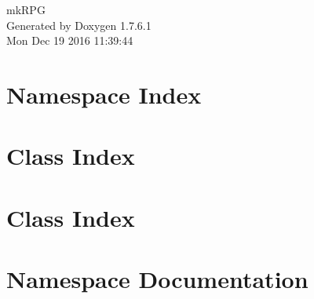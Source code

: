 \documentclass[a4paper]{book}
\begin{document}
\hypersetup{pageanchor=false,citecolor=blue}
\begin{titlepage}
\vspace*{7cm}
\begin{center}
{\Large mk\-R\-P\-G }\\
\vspace*{1cm}
{\large \-Generated by Doxygen 1.7.6.1}\\
\vspace*{0.5cm}
{\small Mon Dec 19 2016 11:39:44}\\
\end{center}
\end{titlepage}
\clearemptydoublepage
{}
\tableofcontents
\clearemptydoublepage
{}
\hypersetup{pageanchor=true,citecolor=blue}
\chapter{\-Namespace \-Index}

\chapter{\-Class \-Index}

\chapter{\-Class \-Index}

\chapter{\-Namespace \-Documentation}


\end{document}
